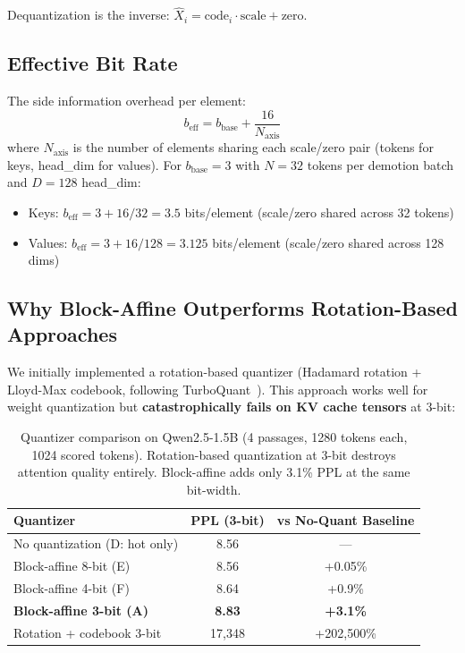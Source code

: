 \documentclass[11pt,a4paper]{article}
\begin{document}
Dequantization is the inverse: $\hat{X}_{i} = \text{code}_i \cdot \text{scale} + \text{zero}$.

\subsection{Effective Bit Rate}

The side information overhead per element:
\begin{equation}
    b_{\text{eff}} = b_{\text{base}} + \frac{16}{N_{\text{axis}}}
\end{equation}
where $N_{\text{axis}}$ is the number of elements sharing each scale/zero pair (tokens for keys, head\_dim for values). For $b_{\text{base}} = 3$ with $N=32$ tokens per demotion batch and $D=128$ head\_dim:
\begin{itemize}
    \item Keys: $b_{\text{eff}} = 3 + 16/32 = 3.5$ bits/element (scale/zero shared across 32 tokens)
    \item Values: $b_{\text{eff}} = 3 + 16/128 = 3.125$ bits/element (scale/zero shared across 128 dims)
\end{itemize}

\subsection{Why Block-Affine Outperforms Rotation-Based Approaches}
\label{sec:rotation-negative}

We initially implemented a rotation-based quantizer (Hadamard rotation + Lloyd-Max codebook, following TurboQuant~\cite{turboquant}). This approach works well for weight quantization but \textbf{catastrophically fails on KV cache tensors} at 3-bit:

\begin{table}[h]
\centering
\begin{tabular}{lcc}
\toprule
\textbf{Quantizer} & \textbf{PPL (3-bit)} & \textbf{vs No-Quant Baseline} \\
\midrule
No quantization (D: hot only) & 8.56 & --- \\
Block-affine 8-bit (E) & 8.56 & +0.05\% \\
Block-affine 4-bit (F) & 8.64 & +0.9\% \\
\textbf{Block-affine 3-bit (A)} & \textbf{8.83} & \textbf{+3.1\%} \\
\midrule
Rotation + codebook 3-bit & 17,348 & +202,500\% \\
\bottomrule
\end{tabular}
\caption{Quantizer comparison on Qwen2.5-1.5B (4 passages, 1280 tokens each, 1024 scored tokens). Rotation-based quantization at 3-bit destroys attention quality entirely. Block-affine adds only 3.1\% PPL at the same bit-width.}
\label{tab:quantizer_comparison}
\end{table}
\end{document}
